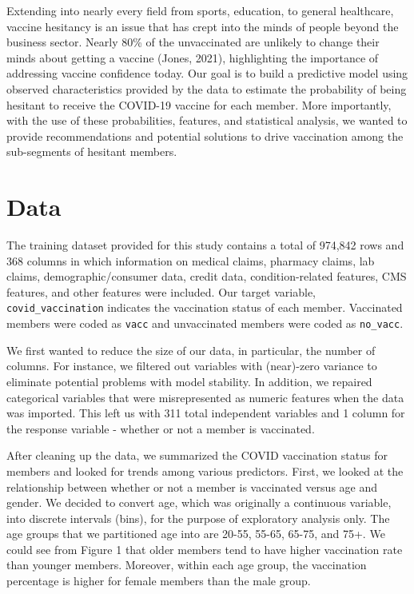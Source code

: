\documentclass[
  12pt,
]{article}
\begin{document}
Extending into nearly every field from sports, education, to general
healthcare, vaccine hesitancy is an issue that has crept into the minds
of people beyond the business sector. Nearly 80\% of the unvaccinated
are unlikely to change their minds about getting a vaccine (Jones,
2021), highlighting the importance of addressing vaccine confidence
today. Our goal is to build a predictive model using observed
characteristics provided by the data to estimate the probability of
being hesitant to receive the COVID-19 vaccine for each member. More
importantly, with the use of these probabilities, features, and
statistical analysis, we wanted to provide recommendations and potential
solutions to drive vaccination among the sub-segments of hesitant
members.

\newpage

\hypertarget{data}{%
\section{Data}\label{data}}

The training dataset provided for this study contains a total of 974,842
rows and 368 columns in which information on medical claims, pharmacy
claims, lab claims, demographic/consumer data, credit data,
condition-related features, CMS features, and other features were
included. Our target variable, \texttt{covid\_vaccination} indicates the
vaccination status of each member. Vaccinated members were coded as
\texttt{vacc} and unvaccinated members were coded as \texttt{no\_vacc}.

We first wanted to reduce the size of our data, in particular, the
number of columns. For instance, we filtered out variables with
(near)-zero variance to eliminate potential problems with model
stability. In addition, we repaired categorical variables that were
misrepresented as numeric features when the data was imported. This left
us with 311 total independent variables and 1 column for the response
variable - whether or not a member is vaccinated.

After cleaning up the data, we summarized the COVID vaccination status
for members and looked for trends among various predictors. First, we
looked at the relationship between whether or not a member is vaccinated
versus age and gender. We decided to convert age, which was originally a
continuous variable, into discrete intervals (bins), for the purpose of
exploratory analysis only. The age groups that we partitioned age into
are 20-55, 55-65, 65-75, and 75+. We could see from Figure 1 that older
members tend to have higher vaccination rate than younger members.
Moreover, within each age group, the vaccination percentage is higher
for female members than the male group.
\end{document}

